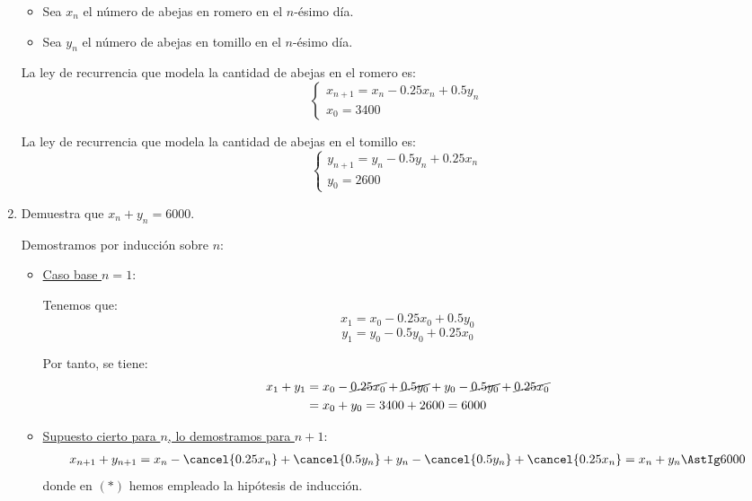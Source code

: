 \begin{ejercicio}
\begin{enumerate}
        \begin{itemize}
            \item Sea $x_n$ el número de abejas en romero en el $n$-ésimo día.
            \item Sea $y_n$ el número de abejas en tomillo en el $n$-ésimo día.
        \end{itemize}

        La ley de recurrencia que modela la cantidad de abejas en el romero es:
        $$\left\{\begin{array}{ll}
            x_{n+1} = x_n - 0.25x_n + 0.5y_n \\
            x_0 = 3400
        \end{array}\right.$$

        La ley de recurrencia que modela la cantidad de abejas en el tomillo es:
        $$\left\{\begin{array}{ll}
            y_{n+1} = y_n - 0.5y_n + 0.25x_n \\
            y_0 = 2600
        \end{array}\right.$$
        
        \item Demuestra que $x_n + y_n = 6000$.

        Demostramos por inducción sobre $n$:
        \begin{itemize}
            \item \ul{Caso base $n=1$}:

            Tenemos que:
            $$x_1 = x_0 - 0.25x_0 + 0.5y_0$$
            $$y_1 = y_0 - 0.5y_0 + 0.25x_0$$

            Por tanto, se tiene:
            \begin{align*}
            x_1+y_1 &= x_0 - \cancel{0.25x_0} + \cancel{0.5y_0}+y_0-\cancel{0.5y_0}+\cancel{0.25x_0} \\
                &= x_0 + y_0 = 3400 + 2600 = 6000
            \end{align*}

            \item \ul{Supuesto cierto para $n$, lo demostramos para $n+1$}:
            \begin{align*}
                x_{n+1} + y_{n+1} = x_n - \cancel{0.25x_n} + \cancel{0.5y_n} + y_n - \cancel{0.5y_n} + \cancel{0.25x_n} = x_n + y_n \AstIg 6000
            \end{align*}
            donde en $(\ast)$ hemos empleado la hipótesis de inducción.
        \end{itemize}
        

\end{enumerate}
\end{ejercicio}
